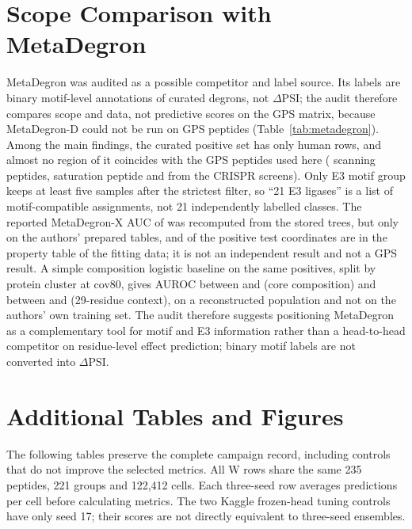 \section{Scope Comparison with MetaDegron}
MetaDegron \citep{zheng2024} was audited as a possible competitor and label source. Its
labels are binary motif-level annotations of curated degrons, not $\Delta$PSI; the audit therefore compares scope
and data, not predictive scores on the GPS matrix, because MetaDegron-D could not be run on GPS peptides
(Table~\ref{tab:metadegron}). Among the main findings, the curated positive set has only \nMdHuman{} human rows, and
almost no region of it coincides with the GPS peptides used here (\nMdOvScan{} scanning peptides, \nMdOvSat{} saturation peptide
and \nMdOvCrispr{} from the CRISPR screens). Only \nMdEThreeStrict{} E3 motif group keeps at least five samples after the strictest filter, so ``21 E3
ligases'' is a list of motif-compatible assignments, not 21 independently labelled classes. The reported
MetaDegron-X AUC of \nMdAuc{} was recomputed from the stored trees, but only on the authors' prepared tables, and \nMdInProps{} of the \nMdTestPos{}
positive test coordinates are in the property table of the fitting data; it is not an independent result and not a
GPS result. A simple composition logistic baseline on the same positives, split by protein cluster at cov80,
gives AUROC between \nCompLo{} and \nCompHi{} (core composition) and between \nCtxLo{} and \nCtxHi{} (29-residue
context), on a reconstructed population and not on the authors' own training set. The audit therefore suggests positioning MetaDegron as a complementary tool for motif and E3 information rather than a
head-to-head competitor on residue-level effect prediction; binary motif labels are not converted into $\Delta$PSI.

\begin{table}[htbp]
  \centering
  \caption[Audit of the MetaDegron data and overlap with the data of this thesis]{Audit of the MetaDegron data and overlap with the data of this thesis}\label{tab:metadegron}
  
\end{table}

\section{Additional Tables and Figures}
The following tables preserve the complete campaign record, including controls that do not improve
the selected metrics. All W rows share the same 235 peptides, 221 groups and 122,412 cells. Each
three-seed row averages predictions per cell before calculating metrics. The two Kaggle frozen-head
tuning controls have only seed 17; their scores are not directly equivalent to three-seed ensembles.


